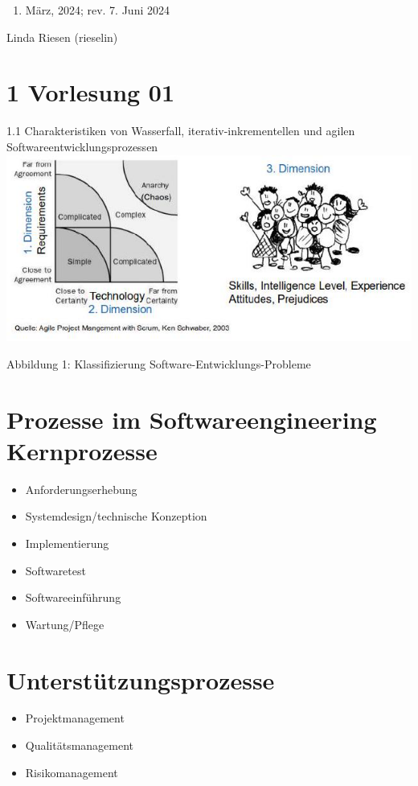 \documentclass[10pt]{article}
\begin{document}
\begin{enumerate}
  \item März, 2024; rev. 7. Juni 2024
\end{enumerate}

Linda Riesen (rieselin)

\section*{1 Vorlesung 01}
1.1 Charakteristiken von Wasserfall, iterativ-inkrementellen und agilen Softwareentwicklungsprozessen\\
\includegraphics[width=\linewidth]{images/2024_12_29_0d1d7b5551ea1b4b41bdg-01}

Abbildung 1: Klassifizierung Software-Entwicklungs-Probleme

\section*{Prozesse im Softwareengineering Kernprozesse}
\begin{itemize}
  \item Anforderungserhebung
  \item Systemdesign/technische Konzeption
  \item Implementierung
  \item Softwaretest
  \item Softwareeinführung
  \item Wartung/Pflege
\end{itemize}

\section*{Unterstützungsprozesse}
\begin{itemize}
  \item Projektmanagement
  \item Qualitätsmanagement
  \item Risikomanagement
\end{itemize}
\end{document}
